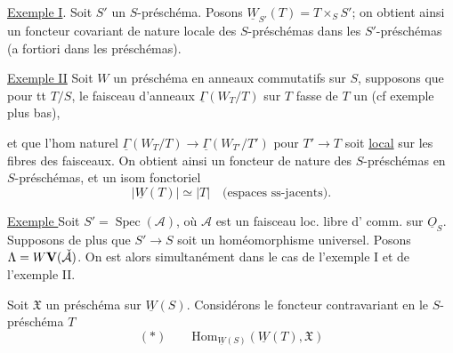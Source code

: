 \uline{Exemple I}. Soit $S'$ un $S$-préschéma. Posons $\underline W_{S'}(T)=T\times_S S'$; on obtient ainsi  un foncteur covariant de nature locale des $S$-préschémas dans les $S'$-préschémas (a fortiori dans les préschémas).


\uline{Exemple II} Soit $W$ un  préschéma en anneaux commutatifs sur $S$, supposons que pour tt $T/S$, le faisceau d'anneaux $\underline\Gamma(W_T/T)$ sur $T$ fasse de $T$ un  (cf exemple plus bas), 

et que l'hom naturel $\underline\Gamma(W_T/T)\to\underline\Gamma(W_{T'}/T')$ pour $T'\to T$  soit \uline{local} sur les fibres des faisceaux. On obtient ainsi un foncteur  de nature  des $S$-préschémas en $S$-préschémas, et un isom fonctoriel
\[
|\underline W(T)|\simeq|T|\quad\text{(espaces ss-jacents)}.
\]

\uline{Exemple } Soit $S'=\operatorname{Spec}(\mathcal A)$, où $\mathcal A$ est un faisceau loc. libre d' comm. sur $\underline O_S$. Supposons de plus que $S'\to S$ soit un homéomorphisme universel. Posons
$\Lambda=W\mathbf V(\check{\mathcal A})$.
On est alors simultanément dans le cas de l'exemple I et de l'exemple II.


Soit $\mathfrak X$ un préschéma sur $\underline W(S)$. Considérons le foncteur contravariant en le $S$-préschéma $T$
\[
(\ast)\qquad \mathrm{Hom}_{\underline W(S)}(\underline W(T),\mathfrak X)
\]

